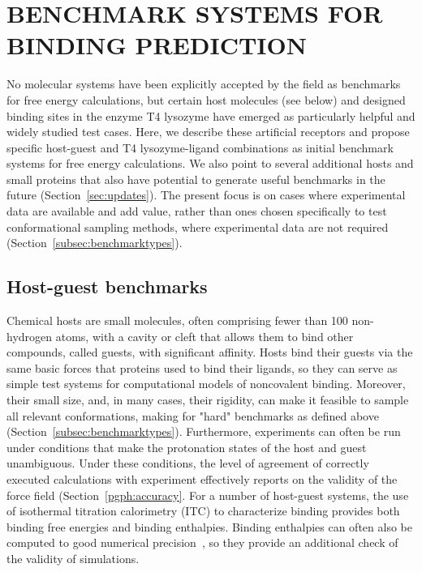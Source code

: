 \documentclass[aps,pre,twocolumn,nofootinbib,superscriptaddress,10pt, final,tightenlines]{revtex4-1}
\begin{document}
\section{BENCHMARK SYSTEMS FOR BINDING PREDICTION}
\label{benchmarks}
No molecular systems have been explicitly accepted by the field as benchmarks for free energy calculations, but certain host molecules (see below) and designed binding sites in the enzyme T4 lysozyme have emerged as particularly helpful and widely studied test cases. 
Here, we describe these artificial receptors and propose specific host-guest and T4 lysozyme-ligand combinations as initial benchmark systems for free energy calculations. 
We also point to several additional hosts and small proteins that also have potential to generate useful benchmarks in the future (Section~\ref{sec:updates}). 
The present focus is on cases where experimental data are available and add value, rather than ones chosen specifically to test conformational sampling methods, where experimental data are not required (Section~\ref{subsec:benchmarktypes}). 

\subsection{Host-guest benchmarks}
Chemical hosts are small molecules, often comprising fewer than 100 non-hydrogen atoms, with a cavity or cleft that allows them to bind other compounds, called guests, with significant affinity.  
Hosts bind their guests via the same basic forces that proteins used to bind their ligands, so they can serve as simple test systems for computational models of noncovalent binding. 
Moreover, their small size, and, in many cases, their rigidity, can make it feasible to sample all relevant conformations, making for "hard" benchmarks as defined above (Section~\ref{subsec:benchmarktypes}).  
Furthermore, experiments can often be run under conditions that make the protonation states of the host and guest unambiguous. Under these conditions, the level of agreement of correctly executed calculations with experiment effectively reports on the validity of the force field (Section~\ref{pgph:accuracy}. 
For a number of host-guest systems, the use of isothermal titration calorimetry (ITC) to characterize binding provides both binding free energies and binding enthalpies. 
Binding enthalpies can often also be computed to good numerical precision~\cite{henriksen_computational_2015}, so they provide an additional check of the validity of simulations. 
\end{document}
